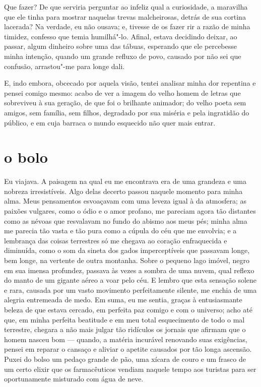 Que fazer? De que serviria perguntar ao infeliz qual a curiosidade,
a maravilha que ele tinha para mostrar naquelas trevas malcheirosas,
detrás de sua cortina lacerada? Na verdade, eu não ousava; e, tivesse
de os fazer rir a razão de minha timidez, confesso que temia
humilhá"-lo. Afinal, estava decidindo deixar, ao passar, algum
dinheiro sobre uma das tábuas, esperando que ele percebesse minha
intenção, quando um grande refluxo de povo, causado por não sei que
confusão, arrastou"-me para longe dali.

E, indo embora, obcecado por aquela visão, tentei analisar minha
dor repentina e pensei comigo mesmo: acabo de ver a imagem do velho homem de
letras que sobreviveu à sua geração, de que foi o brilhante animador;
do velho poeta sem amigos, sem família, sem filhos, degradado por sua
miséria e pela ingratidão do público, e em cuja barraca o mundo esquecido
não quer mais entrar.

\quebra\section[O bolo]{o bolo}

Eu viajava. A paisagem na qual eu me encontrava era de uma grandeza e uma
nobreza irresistíveis. Algo delas decerto passou naquele momento
para minha alma. Meus pensamentos esvoaçavam com uma leveza igual à da
atmosfera; as paixões vulgares, como o ódio e o amor profano, me
pareciam agora tão distantes como as névoas que resvalavam no fundo
do abismo aos meus pés; minha alma me parecia tão vasta e tão pura
como a cúpula do céu que me envolvia; e a lembrança das
coisas terrestres só me chegava ao coração enfraquecida e diminuída,
como o som da sineta dos gados imperceptíveis que passavam longe, bem
longe, na vertente de outra montanha. Sobre o pequeno lago imóvel,
negro em sua imensa profundez, passava às vezes a sombra de uma
nuvem, qual reflexo do manto de um gigante aéreo a voar pelo céu. E
lembro que esta sensação solene e rara, causada por um vasto movimento
perfeitamente silente, me enchia de uma alegria entremeada de medo.
Em suma, eu me sentia, graças à entusiasmante beleza de que estava
cercado, em perfeita paz comigo e com o universo; acho até que, em minha
perfeita beatitude e em meu total esquecimento de todo o mal terrestre,
chegara a não mais julgar tão ridículos os jornais que afirmam que o
homem nasceu bom --- quando, a matéria incurável renovando suas
exigências, pensei em reparar o cansaço e aliviar o apetite causados
por tão longa ascensão. Puxei do bolso um pedaço grande de pão, uma
xícara de couro e um frasco de um certo elixir que os farmacêuticos
vendiam naquele tempo aos turistas para ser oportunamente misturado com
água de neve.

